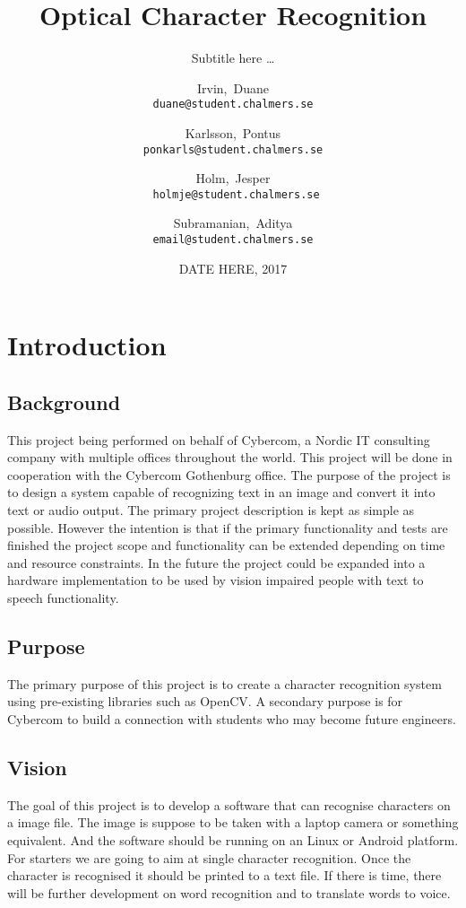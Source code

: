 \documentclass[a4paper, english]{scrartcl}
\title{Optical Character Recognition}
\subtitle{Subtitle here \ldots}
\date{DATE HERE, 2017}
\author{Irvin,~Duane \\ \texttt{duane@student.chalmers.se}
  \and Karlsson,~Pontus \\ \texttt{ponkarls@student.chalmers.se}
  \and Holm,~Jesper \\ \texttt{~holmje@student.chalmers.se}
  \and Subramanian,~Aditya \\ \texttt{email@student.chalmers.se}
}
\begin{document}
\clearpage\maketitle
\thispagestyle{empty}

\pagebreak

\setcounter{page}{1}
\hypersetup{linkcolor=black}
\tableofcontents

\pagebreak

\section{Introduction}
\subsection{Background}
This project being performed on behalf of Cybercom,
a Nordic IT consulting company with multiple offices throughout the world.
This project will be done in cooperation with the Cybercom Gothenburg office.
The purpose of the project is to design a system capable of recognizing text 
in an image and convert it into text or audio output. 
The primary project description is kept as simple as possible. 
However the intention is that if the primary functionality and tests are 
finished the project scope and functionality can be extended depending on 
time and resource constraints. 
In the future the project could be expanded into a hardware implementation 
to be used by vision impaired people with text to speech functionality.
\subsection{Purpose}
The primary purpose of this project is to create a character recognition
system using pre-existing libraries such as OpenCV. 
A secondary purpose is for Cybercom to build a connection with students 
who may become future engineers. 
\subsection{Vision}
The goal of this project is to develop a software that can recognise 
characters on a image file. 
The image is suppose to be taken with a laptop camera or something equivalent.
And the software should be running on an Linux or Android platform. 
For starters we are going to aim at single character recognition.
Once the character is recognised it should be printed to a text file.
If there is time, there will be further development on word recognition and
to translate words to voice.
\end{document}
